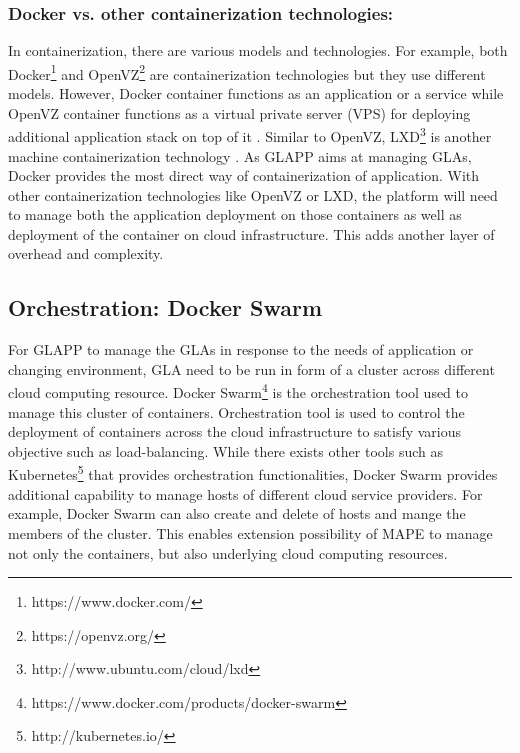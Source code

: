 \documentclass{seal_thesis}
\begin{document}
\subsubsection{Docker vs. other containerization technologies:}
In containerization, there are various models and technologies.
For example, both Docker\footnote{https://www.docker.com/} and OpenVZ\footnote{https://openvz.org/} are containerization technologies but they use different models.
However, Docker container functions as an application or a service while OpenVZ container functions as a virtual private server (VPS) for deploying additional application stack on top of it .
Similar to OpenVZ, LXD\footnote{http://www.ubuntu.com/cloud/lxd} is another machine containerization technology .
As GLAPP aims at managing GLAs, Docker provides the most direct way of containerization of application.
With other containerization technologies like OpenVZ or LXD, the platform will need to manage both the application deployment on those containers as well as deployment of the container on cloud infrastructure.
This adds another layer of overhead and complexity.


\subsection{Orchestration: Docker Swarm}
For GLAPP to manage the GLAs in response to the needs of application or changing environment, GLA need to be run in form of a cluster across different cloud computing resource.
Docker Swarm\footnote{https://www.docker.com/products/docker-swarm} is the orchestration tool used to manage this cluster of containers.
Orchestration tool is used to control the deployment of containers across the cloud infrastructure to satisfy various objective such as load-balancing.
While there exists other tools such as Kubernetes\footnote{http://kubernetes.io/} that provides orchestration functionalities, Docker Swarm provides additional capability to manage hosts of different cloud service providers.
For example, Docker Swarm can also create and delete of hosts and mange the members of the cluster.
This enables extension possibility of MAPE to manage not only the containers, but also underlying cloud computing resources.
\end{document}
